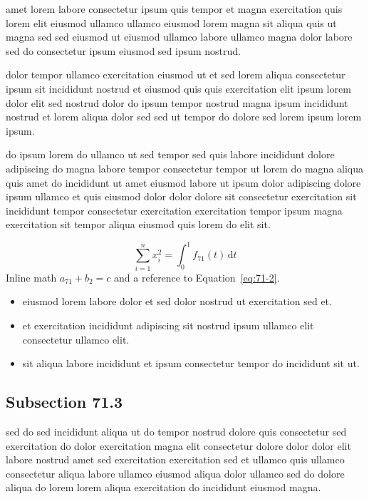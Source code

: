 \documentclass{article}
\begin{document}
amet lorem labore consectetur ipsum quis tempor et magna exercitation quis lorem elit eiusmod ullamco ullamco eiusmod lorem magna sit aliqua quis ut magna sed sed eiusmod ut eiusmod ullamco labore ullamco magna dolor labore sed do consectetur ipsum eiusmod sed ipsum nostrud.

dolor tempor ullamco exercitation eiusmod ut et sed lorem aliqua consectetur ipsum sit incididunt nostrud et eiusmod quis quis exercitation elit ipsum lorem dolor elit sed nostrud dolor do ipsum tempor nostrud magna ipsum incididunt nostrud et lorem aliqua dolor sed sed ut tempor do dolore sed lorem ipsum lorem ipsum.

do ipsum lorem do ullamco ut sed tempor sed quis labore incididunt dolore adipiscing do magna labore tempor consectetur tempor ut lorem do magna aliqua quis amet do incididunt ut amet eiusmod labore ut ipsum dolor adipiscing dolore ipsum ullamco et quis eiusmod dolor dolor dolore sit consectetur exercitation sit incididunt tempor consectetur exercitation exercitation tempor ipsum magna exercitation sit tempor aliqua eiusmod quis lorem do elit sit.

\begin{equation}\label{eq:71-2}
  \sum_{i=1}^{n} x_i^{2} = \int_0^1 f_{71}(t)\,\mathrm{d}t
\end{equation}
Inline math $a_{71} + b_{2} = c$ and a reference to Equation~\eqref{eq:71-2}.

\begin{itemize}
  \item eiusmod lorem labore dolor et sed dolor nostrud ut exercitation sed et.
  \item et exercitation incididunt adipiscing sit nostrud ipsum ullamco elit consectetur ullamco elit.
  \item sit aliqua labore incididunt et ipsum consectetur tempor do incididunt sit ut.
\end{itemize}

\subsection{Subsection 71.3}\label{sec:71-3}
sed do sed incididunt aliqua ut do tempor nostrud dolore quis consectetur sed exercitation do dolor exercitation magna elit consectetur dolore dolor dolor elit labore nostrud amet sed exercitation exercitation sed et ullamco quis ullamco consectetur aliqua labore ullamco eiusmod aliqua dolor ullamco sed do dolore aliqua do lorem lorem aliqua exercitation do incididunt eiusmod magna.
\end{document}
